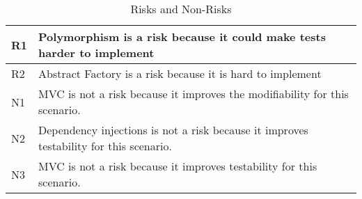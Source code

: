 \begin{table}[h]
  \begin{tabularx}{360pt}{|l|X|}
\hline
R1 & Polymorphism is a risk because it could make tests harder to implement\\
\hline
R2 & Abstract Factory is a risk because it is hard to implement\\
\hline
N1 & MVC is not a risk because it improves the modifiability for this scenario.\\
\hline
N2 & Dependency injections is not a risk because it improves testability for this scenario.\\
\hline
N3 & MVC is not a risk because it improves testability for this scenario.\\
\hline
\end{tabularx}
\caption{Risks and Non-Risks}
\label{risks}
\end{table}
